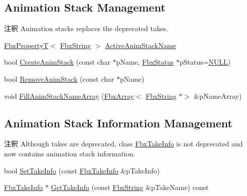 \subsection*{Animation Stack Management}
\label{_amgrp94b0fe1405ba5e573bd029ebe0c96e5d}%
\begin{DoxyRemark}{注釈}
Animation stacks replaces the deprecated takes. 
\end{DoxyRemark}
\begin{DoxyCompactItemize}
\item 
\hyperlink{class_fbx_property_t}{Fbx\+PropertyT}$<$ \hyperlink{class_fbx_string}{Fbx\+String} $>$ \hyperlink{class_fbx_document_aec6d5eb0a7367383477588c087b09b87}{Active\+Anim\+Stack\+Name}
\item 
bool \hyperlink{class_fbx_document_a8180ba3b0b34f301703d77adc912a3a5}{Create\+Anim\+Stack} (const char $\ast$p\+Name, \hyperlink{class_fbx_status}{Fbx\+Status} $\ast$p\+Status=\hyperlink{fbxarch_8h_a070d2ce7b6bb7e5c05602aa8c308d0c4}{N\+U\+LL})
\item 
bool \hyperlink{class_fbx_document_a7f74b885faf1308f36a3923a0a27dc8b}{Remove\+Anim\+Stack} (const char $\ast$p\+Name)
\item 
void \hyperlink{class_fbx_document_a7a60224db8d86ec61e66263bbb683d4e}{Fill\+Anim\+Stack\+Name\+Array} (\hyperlink{class_fbx_array}{Fbx\+Array}$<$ \hyperlink{class_fbx_string}{Fbx\+String} $\ast$$>$ \&p\+Name\+Array)
\end{DoxyCompactItemize}
\subsection*{Animation Stack Information Management}
\label{_amgrp8856145b93782f6fd8b5c7593b27812c}%
\begin{DoxyRemark}{注釈}
Although takes are deprecated, class \hyperlink{class_fbx_take_info}{Fbx\+Take\+Info} is not deprecated and now contains animation stack information. 
\end{DoxyRemark}
\begin{DoxyCompactItemize}
\item 
bool \hyperlink{class_fbx_document_ace5043bd6c9883d00cfb6a2eb6d74d5c}{Set\+Take\+Info} (const \hyperlink{class_fbx_take_info}{Fbx\+Take\+Info} \&p\+Take\+Info)
\item 
\hyperlink{class_fbx_take_info}{Fbx\+Take\+Info} $\ast$ \hyperlink{class_fbx_document_aa524095dfb1dcac18f7b359070841068}{Get\+Take\+Info} (const \hyperlink{class_fbx_string}{Fbx\+String} \&p\+Take\+Name) const
\end{DoxyCompactItemize}
